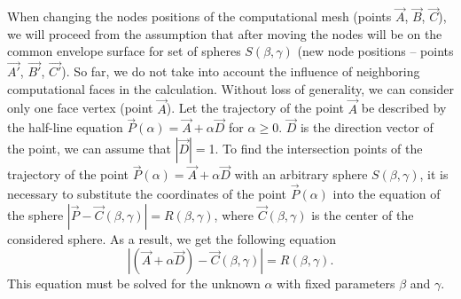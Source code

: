 \documentclass[
11pt,%
tightenlines,%
twoside,%
onecolumn,%
nofloats,%
nobibnotes,%
nofootinbib,%
superscriptaddress,%
noshowpacs,%
centertags]%
{revtex4-2}
\begin{document}
When changing the nodes positions of the computational  mesh (points
$\vec{A}$, $\vec{B}$, $\vec{C}$), we will proceed from the
assumption that after moving the nodes will be on the common
envelope surface for set of spheres $ S(\beta, \gamma)$ (new node
positions -- points $\vec{A'}$, $\vec{B'}$, $\vec{C'}$).
So far, we do not take into account the influence of neighboring
computational faces in the calculation.
Without loss of generality, we can consider only one face vertex (point $\vec{A}$).
Let the trajectory of the point $\vec{A}$ be described by the
half-line equation $\vec{P}(\alpha) = \vec{A} + \alpha \vec{D}$ for
$\alpha \ge 0$.
$\vec{D}$ is the direction vector of the point, we can assume  that
$|\vec{D}| = $1.
To find the intersection points of the trajectory of the point
$\vec{P}(\alpha) = \vec{A} + \alpha \vec{D}$ with an arbitrary
sphere $S(\beta, \gamma)$, it is necessary to substitute the
coordinates of the point $\vec{P}(\alpha)$ into the equation of the
sphere $|\vec{P} - \vec{C}(\beta, \gamma)| = R(\beta, \gamma)$,
where $\vec{C}(\beta, \gamma)$ is the center of the considered
sphere.
As a result, we get the following equation
\begin{equation}\label{eqn:intersect}
|(\vec{A} + \alpha \vec{D}) - \vec{C}(\beta, \gamma)| = R(\beta,
\gamma).
\end{equation}
This equation must be solved for the unknown $\alpha$ with fixed parameters $\beta$ and $\gamma$.
\end{document}
